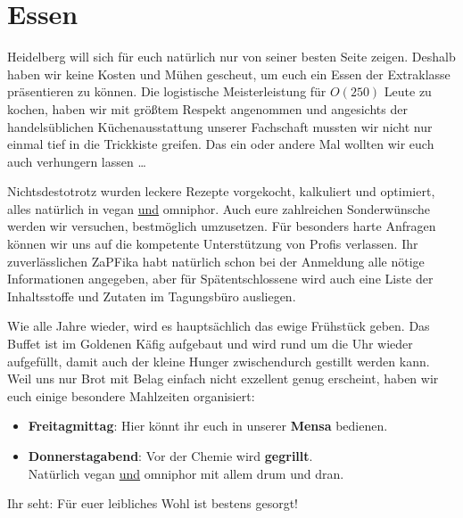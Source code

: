 
\section{Essen}
Heidelberg will sich für euch natürlich nur von seiner besten Seite zeigen. Deshalb haben wir keine Kosten und Mühen gescheut,  um euch ein Essen der Extraklasse präsentieren zu können. Die logistische Meisterleistung für $O(250)$ Leute zu kochen, haben wir mit größtem Respekt angenommen und angesichts der handelsüblichen Küchenausstattung unserer Fachschaft mussten wir nicht nur einmal tief in die Trickkiste greifen. Das ein oder andere Mal wollten wir euch auch verhungern lassen \dots 

Nichtsdestotrotz wurden leckere Rezepte vorgekocht, kalkuliert und optimiert, alles natürlich in vegan \underline{und} omniphor.  Auch eure zahlreichen Sonderwünsche werden wir versuchen, bestmöglich umzusetzen. Für besonders harte Anfragen können wir uns auf die kompetente Unterstützung von Profis verlassen. Ihr zuverlässlichen ZaPFika habt natürlich schon bei der Anmeldung alle nötige Informationen angegeben, aber für Spätentschlossene wird auch eine Liste der Inhaltsstoffe und Zutaten im Tagungsbüro ausliegen.

Wie alle Jahre wieder, wird es hauptsächlich das ewige Frühstück geben. Das Buffet ist im Goldenen Käfig aufgebaut und wird rund um die Uhr wieder aufgefüllt, damit auch der kleine  Hunger zwischendurch gestillt werden kann. Weil uns nur Brot mit Belag einfach nicht exzellent genug erscheint, haben wir euch einige besondere Mahlzeiten organisiert:
  \begin{itemize}
    \item \textbf{Freitagmittag}: Hier könnt ihr euch in unserer \textbf{Mensa} bedienen.
    \item \textbf{Donnerstagabend}: Vor der Chemie wird \textbf{gegrillt}. \\
      Natürlich vegan \underline{und} omniphor mit allem drum und dran.
  \end{itemize}
Ihr seht: Für euer leibliches Wohl ist bestens gesorgt!
